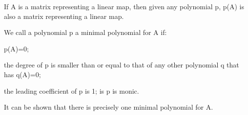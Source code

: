 If A is a matrix representing a linear map, then given any polynomial 
p, p(A) is also a matrix representing a linear map.
\par
We call a polynomial p a minimal polynomial for A if:
\par
p(A)=0;
\par
the degree of p is smaller than or equal to that of any other polynomial q 
that has q(A)=0;
\par
the leading coefficient of p is 1; is p is monic.
\par
It can be shown that there is precisely one minimal polynomial for A.
